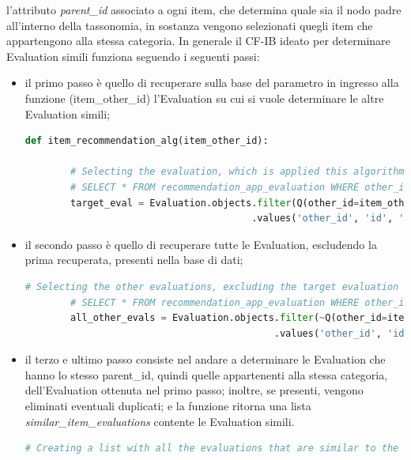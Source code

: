 l'attributo \textit{parent\_id} associato a ogni item, che determina quale sia il nodo padre all'interno della tassonomia, in sostanza 
vengono selezionati quegli item che appartengono alla stessa categoria.\hfill\break
In generale il CF-IB ideato per determinare Evaluation simili funziona seguendo i seguenti passi:
\begin{itemize}
    \item il primo passo è quello di recuperare sulla base del parametro in ingresso alla funzione (item\_other\_id) 
    l'Evaluation su cui si vuole determinare le altre Evaluation simili;
    \begin{lstlisting}[language=Python, label=lst:IB_CF_Evaluation_1]
    def item_recommendation_alg(item_other_id):
        
        # Selecting the evaluation, which is applied this algorithm, from its other_id
        # SELECT * FROM recommendation_app_evaluation WHERE other_id = %(item_other_id)s AND node_type = 'eva'
        target_eval = Evaluation.objects.filter(Q(other_id=item_other_id) & Q(node_type="eva"))\
                                        .values('other_id', 'id', 'parent_id')[0]
    \end{lstlisting} 
    \item il secondo passo è quello di recuperare tutte le Evaluation, escludendo la prima recuperata, presenti nella base di dati;
    \begin{lstlisting}[language=Python, label=lst:IB_CF_Evaluation_2]
        # Selecting the other evaluations, excluding the target evaluation
        # SELECT * FROM recommendation_app_evaluation WHERE other_id != %(item_other_id)s AND node_type = 'eva'
        all_other_evals = Evaluation.objects.filter(~Q(other_id=item_other_id) & Q(node_type="eva"))\
                                            .values('other_id', 'id', 'parent_id').order_by('other_id')
    \end{lstlisting}
    \item il terzo e ultimo passo consiste nel andare a determinare le Evaluation che hanno lo stesso parent\_id, quindi 
    quelle appartenenti alla stessa categoria, dell'Evaluation ottenuta nel primo passo; inoltre, se presenti, vengono 
    eliminati eventuali duplicati; e la funzione ritorna una lista \textit{similar\_item\_evaluations} contente le Evaluation simili.
    \begin{lstlisting}[language=Python, label=lst:IB_CF_Evaluation_3]
        # Creating a list with all the evaluations that are similar to the target evaluation (comparing the parent_id)

\end{lstlisting}
\end{itemize}
